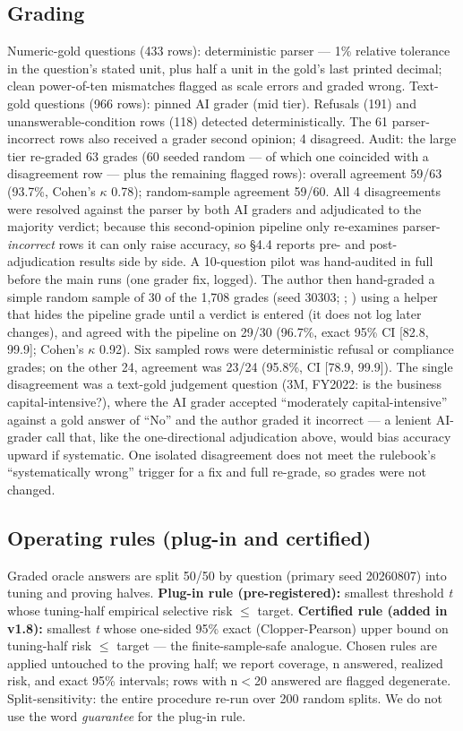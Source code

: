 \documentclass[11pt]{article}
\begin{document}
\subsection{Grading}
Numeric-gold questions (433 rows): deterministic parser --- 1\% relative tolerance in the question's stated unit, plus half a unit in the gold's last printed decimal; clean power-of-ten mismatches flagged as scale errors and graded wrong. Text-gold questions (966 rows): pinned AI grader (mid tier). Refusals (191) and unanswerable-condition rows (118) detected deterministically. The 61 parser-incorrect rows also received a grader second opinion; 4 disagreed. Audit: the large tier re-graded 63 grades (60 seeded random --- of which one coincided with a disagreement row --- plus the remaining flagged rows): overall agreement 59/63 (93.7\%, Cohen's $\kappa$ 0.78); random-sample agreement 59/60. All 4 disagreements were resolved against the parser by both AI graders and adjudicated to the majority verdict; because this second-opinion pipeline only re-examines parser-\emph{incorrect} rows it can only raise accuracy, so \S{}4.4 reports pre- and post-adjudication results side by side. A 10-question pilot was hand-audited in full before the main runs (one grader fix, logged). The author then hand-graded a simple random sample of 30 of the 1,708 grades (seed 30303; ; ) using a helper that hides the pipeline grade until a verdict is entered (it does not log later changes), and agreed with the pipeline on 29/30 (96.7\%, exact 95\% CI [82.8, 99.9]; Cohen's $\kappa$ 0.92). Six sampled rows were deterministic refusal or compliance grades; on the other 24, agreement was 23/24 (95.8\%, CI [78.9, 99.9]). The single disagreement was a text-gold judgement question (3M, FY2022: is the business capital-intensive?), where the AI grader accepted ``moderately capital-intensive'' against a gold answer of ``No'' and the author graded it incorrect --- a lenient AI-grader call that, like the one-directional adjudication above, would bias accuracy upward if systematic. One isolated disagreement does not meet the rulebook's ``systematically wrong'' trigger for a fix and full re-grade, so grades were not changed.


\subsection{Operating rules (plug-in and certified)}
Graded oracle answers are split 50/50 by question (primary seed 20260807) into tuning and proving halves. \textbf{Plug-in rule (pre-registered):} smallest threshold \emph{t} whose tuning-half empirical selective risk $\leq$ target. \textbf{Certified rule (added in v1.8):} smallest \emph{t} whose one-sided 95\% exact (Clopper-Pearson) upper bound on tuning-half risk $\leq$ target --- the finite-sample-safe analogue. Chosen rules are applied untouched to the proving half; we report coverage, n answered, realized risk, and exact 95\% intervals; rows with n$<$20 answered are flagged degenerate. Split-sensitivity: the entire procedure re-run over 200 random splits. We do not use the word \emph{guarantee} for the plug-in rule.
\end{document}
